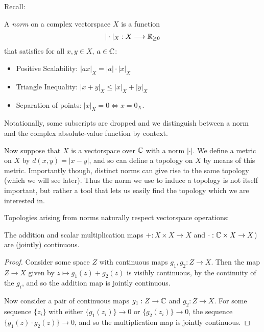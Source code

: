       Recall:
      \begin{defn}
        A \emph{norm} on a complex vectorspace $X$ is a function
        \begin{align*}
          |\cdot|_X:X\longrightarrow\mathbb{R}_{\ge0}
        \end{align*}
        that satisfies for all $x,y\in X$, $a\in\mathbb{C}$:
        \begin{itemize}
          \item Positive Scalability: $|ax|_X=|a|\cdot|x|_X$
          \item Triangle Inequality: $|x+y|_X\le|x|_X+|y|_X$
          \item Separation of points: $|x|_X=0\Longleftrightarrow x=0_X$.
        \end{itemize}
        Notationally, some subscripts are dropped and we distinguish between a norm and the complex absolute-value function by context.
      \end{defn}

      Now suppose that $X$ is a vectorspace over $\mathbb{C}$ with a norm $|\cdot|$.
      We define a metric on $X$ by $d(x,y)=|x-y|$, and so can define a topology on $X$ by means of this metric.
      Importantly though, distinct norms can give rise to the same topology (which we will see later).
      Thus the norm we use to induce a topology is not itself important, but rather a tool that lets us easily find the topology which we are interested in.

      Topologies arising from norms naturally respect vectorspace operations:
      \begin{claim}
        The addition and scalar multiplication maps $+:X\times X\rightarrow X$ and $\cdot:\mathbb{C}\times X\rightarrow X$) are (jointly) continuous\footnotemark.
      \end{claim}
      \begin{proof}
        Consider some space $Z$ with continuous maps $g_1,g_2:Z\rightarrow X$.
        Then the map $Z\rightarrow X$ given by $z\mapsto g_1(z)+g_2(z)$ is visibly continuous, by the continuity of the $g_i$, and so the addition map is jointly continuous.

        Now consider a pair of continuous maps $g_1:Z\rightarrow\mathbb{C}$ and $g_2:Z\rightarrow X$.
        For some sequence $\{z_i\}$ with either $\{g_1(z_i)\}\rightarrow 0$ or $\{g_2(z_i)\}\rightarrow 0$, the sequence $\{g_1(z)\cdot g_2(z)\}\rightarrow 0$, and so the multiplication map is jointly continuous.
      \end{proof}

